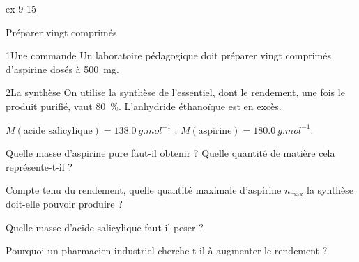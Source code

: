 \begin{blocLivre}{ex-9-15}
\begin{exercice}[3]{Préparer vingt comprimés}
\begin{docu}{1}{Une commande}
Un laboratoire pédagogique doit préparer vingt comprimés d'aspirine dosés à \qty{500}{mg}.
\end{docu}
\begin{docu}{2}{La synthèse}
On utilise la synthèse de l'essentiel, dont le rendement, une fois le produit purifié, vaut \qty{80}{\percent}. L'anhydride éthanoïque
est en excès.
\end{docu}
\begin{donnees}
$M(\text{acide salicylique})=\qty{138,0}{g.mol^{-1}}$ ; $M(\text{aspirine})=\qty{180,0}{g.mol^{-1}}$.
\end{donnees}
\begin{questions}
\item Quelle masse d'aspirine pure faut-il obtenir ? Quelle quantité de matière cela représente-t-il ?
\item Compte tenu du rendement, quelle quantité maximale d'aspirine $n_\text{max}$ la synthèse doit-elle pouvoir produire ?
\item \initiative Quelle masse d'acide salicylique faut-il peser ?
\item Pourquoi un pharmacien industriel cherche-t-il à augmenter le rendement ?
\end{questions}
\end{exercice}
\end{blocLivre}
